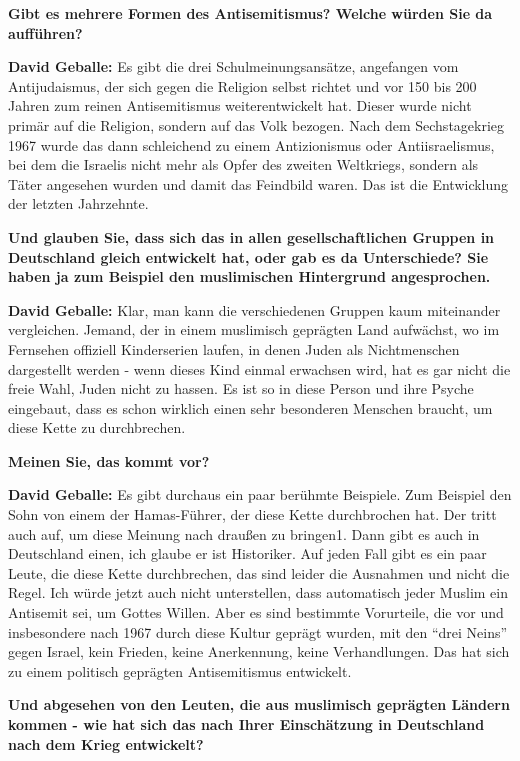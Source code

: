 \textbf{Gibt es mehrere Formen des Antisemitismus? Welche würden Sie da aufführen?}

\textbf{David Geballe:} Es gibt die drei Schulmeinungsansätze, angefangen vom Antijudaismus, der sich gegen die Religion selbst richtet und vor 150 bis 200 Jahren zum reinen Antisemitismus weiterentwickelt hat. Dieser wurde nicht primär auf die Religion, sondern auf das Volk bezogen. Nach dem Sechstagekrieg 1967 wurde das dann schleichend zu einem Antizionismus oder Antiisraelismus, bei dem die Israelis nicht mehr als Opfer des zweiten Weltkriegs, sondern als Täter angesehen wurden und damit das Feindbild waren. Das ist die Entwicklung der letzten Jahrzehnte. 

\textbf{Und glauben Sie, dass sich das in allen gesellschaftlichen Gruppen in Deutschland gleich entwickelt hat, oder gab es da Unterschiede? Sie haben ja zum Beispiel den muslimischen Hintergrund angesprochen.}

\textbf{David Geballe:} Klar, man kann die verschiedenen Gruppen kaum miteinander vergleichen. Jemand, der in einem muslimisch geprägten Land aufwächst, wo im Fernsehen offiziell Kinderserien laufen, in denen Juden als Nichtmenschen dargestellt werden - wenn dieses Kind einmal erwachsen wird, hat es gar nicht die freie Wahl, Juden nicht zu hassen. Es ist so in diese Person und ihre Psyche eingebaut, dass es schon wirklich einen sehr besonderen Menschen braucht, um diese Kette zu durchbrechen. 

\textbf{Meinen Sie, das kommt vor?} 

\textbf{David Geballe:} Es gibt durchaus ein paar berühmte Beispiele. Zum Beispiel den Sohn von einem der Hamas-Führer, der diese Kette durchbrochen hat. Der tritt auch auf, um diese Meinung nach draußen zu bringen1. Dann gibt es auch in Deutschland einen, ich glaube er ist Historiker. Auf jeden Fall gibt es ein paar Leute, die diese Kette durchbrechen, das sind leider die Ausnahmen und nicht die Regel. Ich würde jetzt auch nicht unterstellen, dass automatisch jeder Muslim ein Antisemit sei, um Gottes Willen. Aber es sind bestimmte Vorurteile, die vor und insbesondere nach 1967 durch diese Kultur geprägt wurden, mit den “drei Neins” gegen Israel, kein Frieden, keine Anerkennung, keine Verhandlungen. Das hat sich zu einem politisch geprägten Antisemitismus entwickelt. 

\textbf{Und abgesehen von den Leuten, die aus muslimisch geprägten Ländern kommen - wie hat sich das nach Ihrer Einschätzung in Deutschland nach dem Krieg entwickelt?} 

